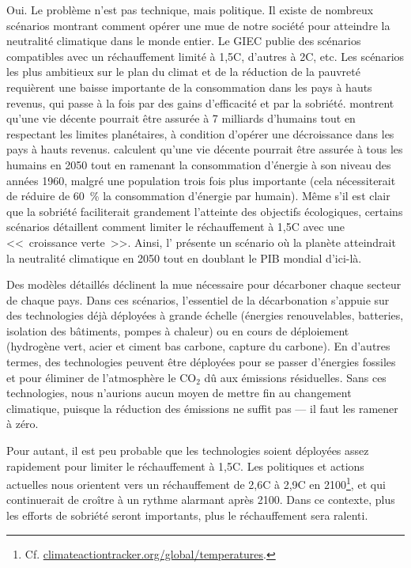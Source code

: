 \documentclass[a5paper,french,openany]{memoir}
\begin{document}
Oui. Le problème n'est pas technique, mais politique. Il existe de nombreux scénarios montrant comment opérer une mue de notre société pour atteindre la neutralité climatique dans le monde entier. Le GIEC publie des scénarios compatibles avec un réchauffement limité à 1,5\textdegree{}C, d'autres à 2\textdegree{}C, etc. Les scénarios les plus ambitieux sur le plan du climat et de la réduction de la pauvreté requièrent une baisse importante de la consommation dans les pays à hauts revenus, qui passe à la fois par des gains d'efficacité et par la sobriété. \cite{oneill_good_2018,hickel_is_2019} montrent qu'une vie décente pourrait être assurée à 7 milliards d'humains tout en respectant les limites planétaires, à condition d'opérer une décroissance dans les pays à hauts revenus. \cite{millward-hopkins_providing_2020} calculent qu'une vie décente pourrait être assurée à tous les humains en 2050 tout en ramenant la consommation d'énergie à son niveau des années 1960, malgré une population trois fois plus importante (cela nécessiterait de réduire de 60~\% la consommation d'énergie par humain). Même s'il est clair que la sobriété faciliterait grandement l'atteinte des objectifs écologiques, certains scénarios détaillent comment limiter le réchauffement à 1,5\textdegree{}C avec une <<~croissance verte~>>. Ainsi, l'\cite{agence_internationale_de_lenergie_net_2023} présente un scénario où la planète atteindrait la neutralité climatique en 2050 tout en doublant le PIB mondial d'ici-là. 

Des modèles détaillés déclinent la mue nécessaire pour décarboner chaque secteur de chaque pays. Dans ces scénarios, l'essentiel de la décarbonation s'appuie sur des technologies déjà déployées à grande échelle (énergies renouvelables, batteries, isolation des bâtiments, pompes à chaleur) ou en cours de déploiement (hydrogène vert, acier et ciment bas carbone, capture du carbone). En d'autres termes, des technologies peuvent être déployées pour se passer d'énergies fossiles et pour éliminer de l'atmosphère le CO$_\text{2}$ dû aux émissions résiduelles. Sans ces technologies, nous n'aurions aucun moyen de mettre fin au changement climatique, puisque la réduction des émissions ne suffit pas --- il faut les ramener à zéro. 

Pour autant, il est peu probable que les technologies soient déployées assez rapidement pour limiter le réchauffement à 1,5\textdegree{}C. Les politiques et actions actuelles nous orientent vers un réchauffement de 2,6\textdegree{}C à 2,9\textdegree{}C en 2100\footnote{Cf. \href{https://climateactiontracker.org/global/temperatures/}{climateactiontracker.org/global/temperatures}.}, et qui continuerait de croître à un rythme alarmant après 2100. Dans ce contexte, plus les efforts de sobriété seront importants, plus le réchauffement sera ralenti. 
\end{document}
